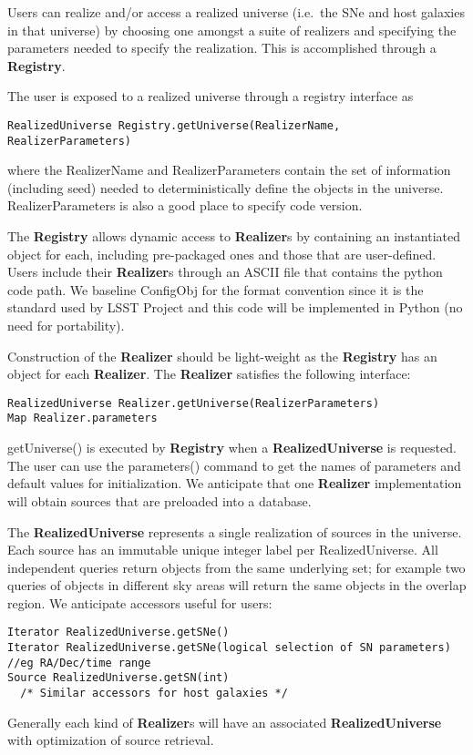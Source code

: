 \documentclass[preprint]{aastex}
\begin{document}
Users can realize and/or access a realized
universe (i.e.\ the SNe and host galaxies in that
universe) by choosing one amongst a suite of realizers and specifying
the parameters needed to specify the realization.  This is accomplished through a
{\bf Registry}.

The user is exposed to a realized universe through a registry interface as
\begin{verbatim}
RealizedUniverse Registry.getUniverse(RealizerName, RealizerParameters)
\end{verbatim}
where the RealizerName and RealizerParameters contain the set of information (including seed) needed
to deterministically define the objects in the universe.   RealizerParameters is also
a good place to specify code version.

The {\bf Registry} allows dynamic access to  {\bf Realizer}s by containing
an instantiated object for each, including 
pre-packaged ones and those that are user-defined.  Users include their {\bf Realizer}s
through
an  ASCII file that contains the 
python code path.
We baseline ConfigObj for the format convention since it is the standard used by
LSST Project and
this code will be implemented in Python (no need for portability).

Construction of the {\bf Realizer} should be light-weight as
the {\bf Registry} has an object for each  {\bf Realizer}.
The {\bf Realizer} satisfies the following interface:
\begin{verbatim}
RealizedUniverse Realizer.getUniverse(RealizerParameters)
Map Realizer.parameters
\end{verbatim}
getUniverse() is executed by {\bf Registry} when a {\bf RealizedUniverse} is requested.
The user can use the parameters() command to get the names of parameters and
default values for initialization.  We anticipate that one {\bf Realizer} implementation
will obtain sources that are preloaded into a database.

The {\bf RealizedUniverse} represents a single realization of sources in the universe.
Each source has an immutable unique integer label per RealizedUniverse.
All independent queries return objects from the same underlying set; for example two
queries of objects in different sky areas will return the same objects in the overlap
region.  We anticipate accessors useful for users:
\begin{verbatim}
Iterator RealizedUniverse.getSNe()
Iterator RealizedUniverse.getSNe(logical selection of SN parameters) //eg RA/Dec/time range
Source RealizedUniverse.getSN(int)
  /* Similar accessors for host galaxies */
\end{verbatim}
Generally each kind of {\bf Realizer}s will have an associated {\bf RealizedUniverse}
with optimization of source retrieval.
\end{document}
